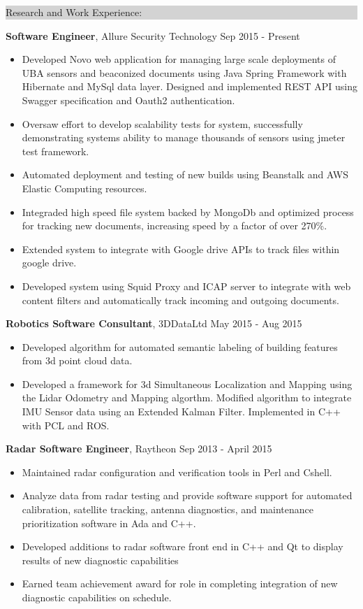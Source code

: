 \documentclass{article} %
\newcommand{\rsection}[1]{
\hspace{-0.4cm}
\colorbox{lightgrey}{
\begin{minipage}{1.07\linewidth}
\vspace{0.25cm}
\fontsize{14pt}{16pt}\selectfont #1 
\vspace{0.15cm}
\end{minipage}
}
\vspace*{-0.2cm}
}
\newcommand{\rjob}[2]{
\vspace{0.1cm}
\hspace*{-0.3cm}  
{\fontsize{10pt}{12pt}\selectfont #1} \hfill #2 
\vspace*{0.1cm} 
\hspace*{-1.2cm}
}
\newenvironment{ritemize}{
\hspace*{-0.8cm} 
\begin{minipage}{1.05\linewidth}
\begin{itemize}
}{
\end{itemize}
\end{minipage}
\vspace{-0.2cm}
}
\newcommand{\ritem}{
\item[-]
}
\begin{document}
\rsection{Research and Work Experience:}

\rjob{\textbf{Software Engineer}, Allure Security Technology}{Sep 2015 - Present}\\
\begin{ritemize}
\ritem Developed Novo web application for managing large scale deployments of UBA sensors and beaconized documents using Java Spring Framework with Hibernate and MySql data layer. Designed and implemented REST API using Swagger specification and Oauth2 authentication. 
\ritem Oversaw effort to develop scalability tests for system, successfully demonstrating systems ability to manage thousands of sensors using jmeter test framework.
\ritem Automated deployment and testing of new builds using Beanstalk and AWS Elastic Computing resources.
\ritem Integraded high speed file system backed by MongoDb and optimized process for tracking new documents, increasing speed by a factor of over 270\%.
\ritem Extended system to integrate with Google drive APIs to track files within google drive.
\ritem Developed system using Squid Proxy and ICAP server to integrate with web content filters and automatically track incoming and outgoing documents.
\end{ritemize}

\rjob{\textbf{Robotics Software Consultant}, 3DDataLtd}{May 2015 - Aug 2015}\\
\begin{ritemize}
\ritem Developed algorithm for automated semantic labeling of building features from 3d point cloud data.
\ritem Developed a framework for 3d Simultaneous Localization and Mapping using the Lidar Odometry and Mapping algorthm. Modified algorithm to integrate IMU Sensor data using an Extended Kalman Filter. Implemented in C++ with PCL and ROS.
\end{ritemize}

\rjob{\textbf{Radar Software Engineer}, Raytheon}{Sep 2013 - April 2015}\\
\begin{ritemize}
\ritem Maintained radar configuration and verification tools in Perl and Cshell.
\ritem Analyze data from radar testing and provide software support for automated calibration, satellite tracking, antenna diagnostics, and maintenance prioritization software in Ada and C++.
\ritem Developed additions to radar software front end in C++ and Qt to display results of new diagnostic capabilities
\ritem Earned team achievement award for role in completing integration of new diagnostic capabilities on schedule.
\end{ritemize}
\end{document}

